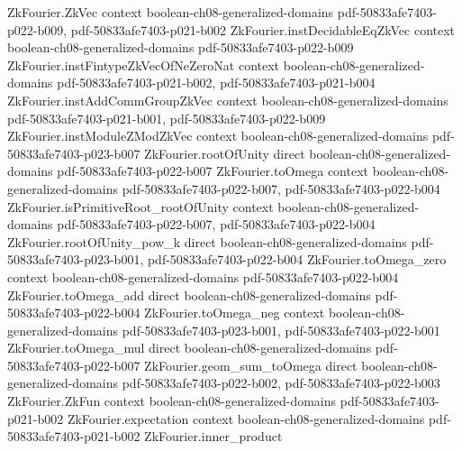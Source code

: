 \begin{lemma}
\label{ZkFourier.fourier_coeff_char_of_ne}
\leanok
{}
\proofstep
  {ZkFourier.ZkVec}
  {context}
  {boolean-ch08-generalized-domains}
  {pdf-50833afe7403-p022-b009,
    pdf-50833afe7403-p021-b002}
\proofstep
  {ZkFourier.instDecidableEqZkVec}
  {context}
  {boolean-ch08-generalized-domains}
  {pdf-50833afe7403-p022-b009}
\proofstep
  {ZkFourier.instFintypeZkVecOfNeZeroNat}
  {context}
  {boolean-ch08-generalized-domains}
  {pdf-50833afe7403-p021-b002,
    pdf-50833afe7403-p021-b004}
\proofstep
  {ZkFourier.instAddCommGroupZkVec}
  {context}
  {boolean-ch08-generalized-domains}
  {pdf-50833afe7403-p021-b001,
    pdf-50833afe7403-p022-b009}
\proofstep
  {ZkFourier.instModuleZModZkVec}
  {context}
  {boolean-ch08-generalized-domains}
  {pdf-50833afe7403-p023-b007}
\proofstep
  {ZkFourier.rootOfUnity}
  {direct}
  {boolean-ch08-generalized-domains}
  {pdf-50833afe7403-p022-b007}
\proofstep
  {ZkFourier.toOmega}
  {context}
  {boolean-ch08-generalized-domains}
  {pdf-50833afe7403-p022-b007,
    pdf-50833afe7403-p022-b004}
\proofstep
  {ZkFourier.isPrimitiveRoot_rootOfUnity}
  {context}
  {boolean-ch08-generalized-domains}
  {pdf-50833afe7403-p022-b007,
    pdf-50833afe7403-p022-b004}
\proofstep
  {ZkFourier.rootOfUnity_pow_k}
  {direct}
  {boolean-ch08-generalized-domains}
  {pdf-50833afe7403-p023-b001,
    pdf-50833afe7403-p022-b004}
\proofstep
  {ZkFourier.toOmega_zero}
  {context}
  {boolean-ch08-generalized-domains}
  {pdf-50833afe7403-p022-b004}
\proofstep
  {ZkFourier.toOmega_add}
  {direct}
  {boolean-ch08-generalized-domains}
  {pdf-50833afe7403-p022-b004}
\proofstep
  {ZkFourier.toOmega_neg}
  {context}
  {boolean-ch08-generalized-domains}
  {pdf-50833afe7403-p023-b001,
    pdf-50833afe7403-p022-b001}
\proofstep
  {ZkFourier.toOmega_mul}
  {direct}
  {boolean-ch08-generalized-domains}
  {pdf-50833afe7403-p022-b007}
\proofstep
  {ZkFourier.geom_sum_toOmega}
  {direct}
  {boolean-ch08-generalized-domains}
  {pdf-50833afe7403-p022-b002,
    pdf-50833afe7403-p022-b003}
\proofstep
  {ZkFourier.ZkFun}
  {context}
  {boolean-ch08-generalized-domains}
  {pdf-50833afe7403-p021-b002}
\proofstep
  {ZkFourier.expectation}
  {context}
  {boolean-ch08-generalized-domains}
  {pdf-50833afe7403-p021-b002}
\proofstep
  {ZkFourier.inner_product}

\end{lemma}

